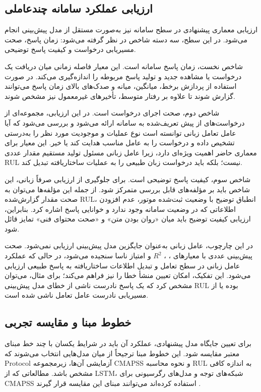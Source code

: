 \documentclass[a4paper,fleqn]{report}
\begin{document}
\subsection{ارزیابی عملکرد سامانه چندعاملی}
\label{sec:multiagent-metrics}

ارزیابی معماری پیشنهادی در سطح سامانه نیز به‌صورت مستقل از مدل
پیش‌بینی انجام می‌شود. در این سطح، سه دسته شاخص در نظر گرفته
می‌شود: زمان پاسخ، صحت مسیریابی درخواست و کیفیت پاسخ توضیحی.

شاخص نخست، زمان پاسخ سامانه است. این معیار فاصله زمانی میان
دریافت یک درخواست یا مشاهده جدید و تولید پاسخ مربوطه را اندازه‌گیری
می‌کند. در صورت استفاده از پردازش برخط، میانگین، میانه و صدک‌های
بالای زمان پاسخ می‌توانند گزارش شوند تا علاوه بر رفتار متوسط،
تأخیرهای غیرمعمول نیز مشخص شوند.

شاخص دوم، صحت اجرای درخواست است. در این ارزیابی، مجموعه‌ای از
درخواست‌های از پیش تعریف‌شده به سامانه ارائه می‌شود و بررسی
می‌شود که آیا عامل تعامل زبانی توانسته است نوع عملیات و موجودیت
مورد نظر را به‌درستی تشخیص داده و درخواست را به عامل مناسب
هدایت کند یا خیر. این معیار برای معماری حاضر اهمیت ویژه‌ای دارد،
زیرا عامل زبانی مسئول تولید مستقیم مقدار عددی \gls{RUL} نیست؛
بلکه باید درخواست زبان طبیعی را به عملیات ساختاریافته تبدیل کند.

شاخص سوم، کیفیت پاسخ توضیحی است. برای جلوگیری از ارزیابی صرفاً
زبانی، این شاخص باید بر مؤلفه‌های قابل بررسی متمرکز شود. از جمله
این مؤلفه‌ها می‌توان به صحت مقدار گزارش‌شده \gls{RUL}، انطباق
توضیح با وضعیت ثبت‌شده موتور، عدم افزودن اطلاعاتی که در وضعیت
سامانه وجود ندارد و خوانایی پاسخ اشاره کرد. بنابراین، ارزیابی
کیفیت توضیح باید میان «روان بودن متن» و «صحت محتوای فنی» تمایز
قائل شود.

در این چارچوب، عامل زبانی به‌عنوان جایگزین مدل پیش‌بینی ارزیابی
نمی‌شود. صحت پیش‌بینی عددی با معیارهای ، ،
$R^2$ و امتیاز ناسا سنجیده می‌شود، در حالی که عملکرد عامل زبانی
در سطح تعامل و تبدیل اطلاعات ساختاریافته به پاسخ طبیعی ارزیابی
می‌شود. این تفکیک، امکان تعیین منشأ خطا را نیز فراهم می‌کند؛
برای مثال، می‌توان مشخص کرد که یک پاسخ نادرست ناشی از خطای
مدل پیش‌بینی \gls{RUL} بوده یا از مسیریابی نادرست عامل تعامل ناشی شده است.

\subsection{خطوط مبنا و مقایسه تجربی}
\label{sec:baselines}

برای تعیین جایگاه مدل پیشنهادی، عملکرد آن باید در شرایط یکسان با
چند خط مبنای معتبر مقایسه شود. این خطوط مبنا ترجیحاً از میان
مدل‌هایی انتخاب می‌شوند که \gls{Protocol} آزمایشی آن‌ها، زیرمجموعه
\gls{CMAPSS} و نحوه محاسبه \gls{RUL} به اندازه کافی مشخص باشد.
مطالعاتی که از LSTM، شبکه‌های توجه و مدل‌های رگرسیونی برای
CMAPSS استفاده کرده‌اند می‌توانند مبنای این مقایسه قرار گیرند
\cite{heimes2008recurrent,li2025attentiondt,smith2025cmapsslinear}.
\end{document}

